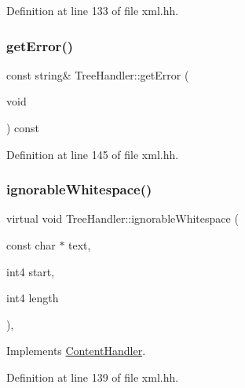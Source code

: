Definition at line 133 of file xml.\+hh.

\mbox{\label{class_tree_handler_a38b7b5077f014448ef8e79860bb4095d}} 
\subsubsection{\texorpdfstring{getError()}{getError()}}
{\footnotesize\ttfamily const string\& Tree\+Handler\+::get\+Error (\begin{DoxyParamCaption}\item[{void}]{ }\end{DoxyParamCaption}) const\hspace{0.3cm}{\ttfamily [inline]}}



Definition at line 145 of file xml.\+hh.

\mbox{\label{class_tree_handler_a9364537779e9dd81b59f3572343d3207}} 
\subsubsection{\texorpdfstring{ignorableWhitespace()}{ignorableWhitespace()}}
{\footnotesize\ttfamily virtual void Tree\+Handler\+::ignorable\+Whitespace (\begin{DoxyParamCaption}\item[{const char $\ast$}]{text,  }\item[{int4}]{start,  }\item[{int4}]{length }\end{DoxyParamCaption})\hspace{0.3cm}{\ttfamily [inline]}, {\ttfamily [virtual]}}



Implements \mbox{\hyperlink{class_content_handler_a3158c975bb26ff02b941954cb4764da9}{Content\+Handler}}.



Definition at line 139 of file xml.\+hh.

\mbox{\label{class_tree_handler_aca0bd5378ea9bc32f218b47be7202b00}} 
